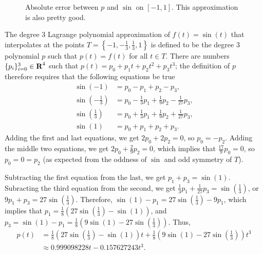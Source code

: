 \documentclass{homework}
\begin{document}
\begin{alphaparts}
		\begin{figure}
			\centering
			\caption{Absolute error between $p$ and $\sin$ on $[-1,1]$. This approximation is also pretty good.}
			\label{fig:taylor_error}
		\end{figure}
		
		\questionpart The degree 3 Lagrange polynomial approximation of $f(t) = \sin(t)$ that interpolates at the points $T = \left\{-1,-\frac{1}{3},\frac{1}{3}, 1\right\}$ is defined to be the degree 3 polynomial $p$ such that $p(t) = f(t)$ for all $t \in T$. There are numbers $\{p_i\}_{i=0}^3 \in \textbf{R}^4$ such that $p(t) = p_0 + p_1t + p_2t^2 + p_3t^3$; the definition of $p$ therefore requires that the following equations be true
		\begin{align}
			\sin(-1) &= p_0 - p_1 + p_2 - p_3, \\
			\sin\left(-\frac{1}{3}\right) &= p_0 - \frac{1}{3}p_1 + \frac{1}{9}p_2 - \frac{1}{27}p_3, \\
			\sin\left(\frac{1}{3}\right) &= p_0 + \frac{1}{3}p_1 + \frac{1}{9}p_2 + \frac{1}{27}p_3, \\
			\sin(1) &= p_0 + p_1 + p_2 + p_3.
		\end{align}
		Adding the first and last equations, we get $2p_0 + 2p_2 = 0$, so $p_0 = -p_2$. Adding the middle two equations, we get $2p_0 + \frac{2}{9}p_2 =0$, which implies that $\frac{17}{9}p_0 = 0$, so $p_0 = 0 = p_2$ (as expected from the oddness of $\sin$ and odd symmetry of $T$). 
		
		Subtracting the first equation from the last, we get $p_1 + p_3 = \sin(1)$. Subracting the third equation from the second, we get $\frac{1}{3}p_1 + \frac{1}{27}p_3 = \sin\left(\frac{1}{3}\right)$, or $9p_1 + p_3 = 27\sin\left(\frac{1}{3}\right)$. Therefore, $\sin(1) - p_1 = 27\sin\left(\frac{1}{3}\right) - 9p_1$, which implies that $p_1 = \frac{1}{8}\left(27\sin\left(\frac{1}{3}\right) - \sin(1)\right)$, and $p_3 = \sin(1) - p_1 = \frac{1}{8}\left(9\sin(1) - 27\sin\left(\frac{1}{3}\right)\right)$. Thus,
		\begin{align}
			p(t) &=  \frac{1}{8}\left(27\sin\left(\frac{1}{3}\right) - \sin(1)\right)t + \frac{1}{8}\left(9\sin(1) - 27\sin\left(\frac{1}{3}\right)\right)t^3\\
			&\approx 0.999098228 t - 0.157627243 t^3.
		\end{align}
		

\end{alphaparts}
\end{document}
